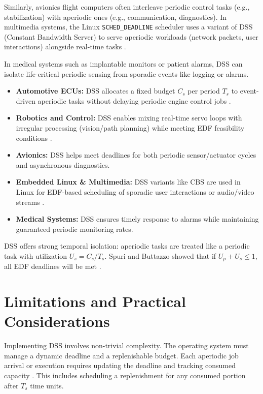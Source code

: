 \documentclass[conference]{IEEEtran}
\begin{document}
Similarly, avionics flight computers often interleave periodic control tasks (e.g., stabilization) with aperiodic ones (e.g., communication, diagnostics). In multimedia systems, the Linux \texttt{SCHED\_DEADLINE} scheduler uses a variant of DSS (Constant Bandwidth Server) to serve aperiodic workloads (network packets, user interactions) alongside real-time tasks \cite{cpen432}.

In medical systems such as implantable monitors or patient alarms, DSS can isolate life-critical periodic sensing from sporadic events like logging or alarms.

\begin{itemize}
    \item \textbf{Automotive ECUs:} DSS allocates a fixed budget $C_s$ per period $T_s$ to event-driven aperiodic tasks without delaying periodic engine control jobs \cite{diva2020ecu}.
    \item \textbf{Robotics and Control:} DSS enables mixing real-time servo loops with irregular processing (vision/path planning) while meeting EDF feasibility conditions \cite{cpen432}.
    \item \textbf{Avionics:} DSS helps meet deadlines for both periodic sensor/actuator cycles and asynchronous diagnostics.
    \item \textbf{Embedded Linux \& Multimedia:} DSS variants like CBS are used in Linux for EDF-based scheduling of sporadic user interactions or audio/video streams \cite{cpen432}.
    \item \textbf{Medical Systems:} DSS ensures timely response to alarms while maintaining guaranteed periodic monitoring rates.
\end{itemize}

DSS offers strong temporal isolation: aperiodic tasks are treated like a periodic task with utilization $U_s = C_s / T_s$. Spuri and Buttazzo showed that if $U_p + U_s \leq 1$, all EDF deadlines will be met \cite{spuri1994efficient, buttazzo2011hard}.

\section{Limitations and Practical Considerations}

Implementing DSS involves non-trivial complexity. The operating system must manage a dynamic deadline and a replenishable budget. Each aperiodic job arrival or execution requires updating the deadline and tracking consumed capacity \cite{cpen432}. This includes scheduling a replenishment for any consumed portion after $T_s$ time units.
\end{document}
